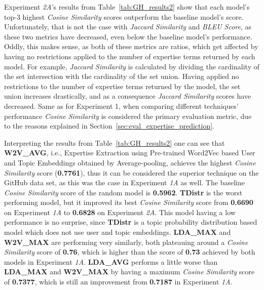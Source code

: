             Experiment \emph{2A}'s results from Table~\ref{tab:GH_results2} show that each model's top-$3$ highest \emph{Cosine Similarity} scores outperform the baseline model's score. Unfortunately, that is not the case with \emph{Jaccard Similarity} and \emph{BLEU Score}, as these two metrics have decreased, even below the baseline model's performance. Oddly, this makes sense, as both of these metrics are ratios, which get affected by having no restrictions applied to the number of expertise terms returned by each model. For example, \emph{Jaccard Similarity} is calculated by dividing the cardinality of the set intersection with the cardinality of the set union. Having applied no restrictions to the number of expertise terms returned by the model, the set union increases drastically, and as a consequence \emph{Jaccard Similarity} scores have decreased. Same as for Experiment 1, when comparing different techniques' performance \emph{Cosine Similarity} is considered the primary evaluation metric, due to the reasons explained in Section~\ref{sec:eval_expertise_prediction}.
            
            Interpreting the results from Table~\ref{tab:GH_results2} one can see that \textbf{W2V\_AVG}, i.e.,  Expertise Extraction using Pre-trained Word2Vec based User and Topic Embeddings obtained by Average-pooling, achieves the highest \emph{Cosine Similarity} score (\textbf{0.7761}), thus it can be considered the superior technique on the GitHub data set, as this was the case in Experiment \emph{1A} as well. The baseline \emph{Cosine Similarity} score of the random model is \textbf{0.5962}. \textbf{TDistr} is the worst performing model, but it improved its best \emph{Cosine Similarity} score from \textbf{0.6690} on Experiment \emph{1A} to \textbf{0.6828} on Experiment \emph{2A}. This model having a low performance is no surprise, since \textbf{TDistr} is a topic probability distribution based model which does not use user and topic embeddings. \textbf{LDA\_MAX} and \textbf{W2V\_MAX} are performing very similarly, both plateauing around a \emph{Cosine Similarity} score of \textbf{0.76}, which is higher than the score of \textbf{0.73} achieved by both models in Experiment \emph{1A}. \textbf{LDA\_AVG} performs a little worse than \textbf{LDA\_MAX} and \textbf{W2V\_MAX} by having a maximum \emph{Cosine Similarity} score of \textbf{0.7377}, which is still an improvement from \textbf{0.7187} in Experiment \emph{1A}.
            
